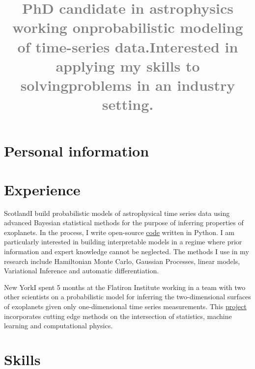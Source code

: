 \documentclass[11pt,a4paper,roman, colorlinks,linkcolor=true]{moderncv}
\title{\textcolor{gray}{ \normalsize PhD candidate in astrophysics 
working on\newline probabilistic modeling of time-series data.\newline Interested 
in applying my skills to solving\newline problems in an industry setting.}}
\begin{document}
\renewcommand*{\titlefont}{\fontsize{14}{18}\mdseries\upshape}
\makecvtitle
\section{Personal information}

\hypersetup{urlcolor=links}
\section{Experience}
{Scotland}{}{I build probabilistic models of astrophysical time series data 
using advanced Bayesian statistical methods for the purpose of inferring properties of exoplanets.
In the process, I write open-source \href{https://caustic.readthedocs.io/en/latest/}{code} written in \textsf{Python}.
I am particularly interested in building interpretable models in a regime where prior information and expert knowledge cannot be neglected.
The methods I use in my research include Hamiltonian Monte Carlo, Gaussian Processes, linear models, Variational Inference and automatic differentiation.}

{New York}{}{I spent 5 months at the Flatiron Institute working in a team with two other scientists on a probabilistic model for inferring the two-dimensional surfaces of exoplanets given only one-dimensional time series measurements.
This \href{https://github.com/fbartolic/volcano/blob/master-pdf/paper/paper.pdf}{project} incorporates cutting edge methods on the intersection of statistics, machine learning and computational physics.}

\section{Skills}
\end{document}
